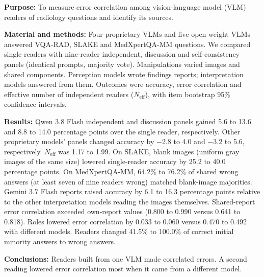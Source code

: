 \textbf{Purpose:} To measure error correlation among vision-language model (VLM) readers of radiology questions and identify its sources.

\textbf{Material and methods:} Four proprietary VLMs and five open-weight VLMs answered VQA-RAD, SLAKE and MedXpertQA-MM questions. We compared single readers with nine-reader independent, discussion and self-consistency panels (identical prompts, majority vote). Manipulations varied images and shared components. Perception models wrote findings reports; interpretation models answered from them. Outcomes were accuracy, error correlation and effective number of independent readers ($N_{\mathrm{eff}}$), with item bootstrap 95\% confidence intervals.

\textbf{Results:} Qwen 3.8 Flash independent and discussion panels gained 5.6 to 13.6 and 8.8 to 14.0 percentage points over the single reader, respectively. Other proprietary models' panels changed accuracy by $-$2.8 to 4.0 and $-$3.2 to 5.6, respectively. $N_{\mathrm{eff}}$ was 1.17 to 1.99. On SLAKE, blank images (uniform gray images of the same size) lowered single-reader accuracy by 25.2 to 40.0 percentage points. On MedXpertQA-MM, 64.2\% to 76.2\% of shared wrong answers (at least seven of nine readers wrong) matched blank-image majorities. Gemini 3.7 Flash reports raised accuracy by 6.1 to 16.3 percentage points relative to the other interpretation models reading the images themselves. Shared-report error correlation exceeded own-report values (0.800 to 0.990 versus 0.641 to 0.818). Roles lowered error correlation by 0.033 to 0.060 versus 0.470 to 0.492 with different models. Readers changed 41.5\% to 100.0\% of correct initial minority answers to wrong answers.

\textbf{Conclusions:} Readers built from one VLM made correlated errors. A second reading lowered error correlation most when it came from a different model.
